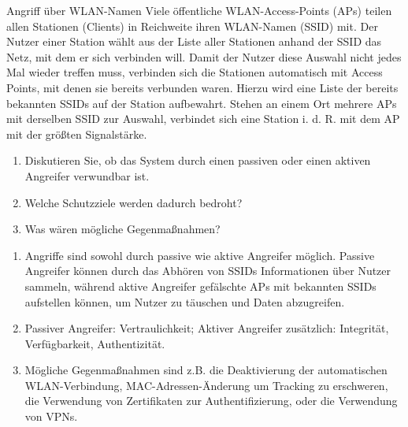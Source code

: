 \documentclass{article}
\begin{document}
\begin{exercise}{Angriff über WLAN-Namen}
  Viele öffentliche WLAN-Access-Points (APs) teilen allen Stationen (Clients) in Reichweite ihren WLAN-Namen (SSID) mit. Der Nutzer einer Station wählt aus der Liste aller Stationen anhand der SSID das Netz, mit dem er sich verbinden will. Damit der Nutzer diese Auswahl nicht jedes Mal wieder treffen muss, verbinden sich die Stationen automatisch mit Access Points, mit denen sie bereits verbunden waren. Hierzu wird eine Liste der bereits bekannten SSIDs auf der Station aufbewahrt. Stehen an einem Ort mehrere APs mit derselben SSID zur Auswahl, verbindet sich eine Station i. d. R. mit dem AP mit der größten Signalstärke.
  \begin{enumerate}
    \item Diskutieren Sie, ob das System durch einen passiven oder einen aktiven Angreifer verwundbar ist.
    \item Welche Schutzziele werden dadurch bedroht?
    \item Was wären mögliche Gegenmaßnahmen?
  \end{enumerate}

  \begin{solution}
    \begin{enumerate}
      \item Angriffe sind sowohl durch passive wie aktive Angreifer möglich. Passive Angreifer können durch das Abhören von SSIDs Informationen über Nutzer sammeln, während aktive Angreifer gefälschte APs mit bekannten SSIDs aufstellen können, um Nutzer zu täuschen und Daten abzugreifen.
      \item Passiver Angreifer: Vertraulichkeit; Aktiver Angreifer zusätzlich: Integrität, Verfügbarkeit, Authentizität.
      \item Mögliche Gegenmaßnahmen sind z.B. die Deaktivierung der automatischen WLAN-Verbindung, MAC-Adressen-Änderung um Tracking zu erschweren, die Verwendung von Zertifikaten zur Authentifizierung, oder die Verwendung von VPNs.
    \end{enumerate}
  \end{solution}
\end{exercise}
\end{document}
